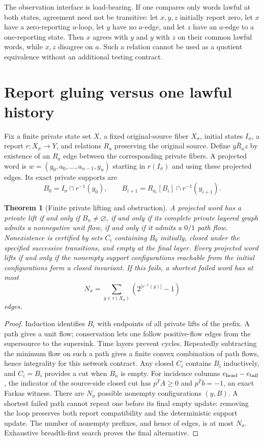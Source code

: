 \documentclass[11pt]{article}
\newtheorem{theorem}{Theorem}
\begin{document}
The observation interface is load-bearing. If one compares only words lawful
at both states, agreement need not be transitive: let $x,y,z$ initially report
zero, let $x$ have a zero-reporting $a$-loop, let $y$ have no $a$-edge, and let
$z$ have an $a$-edge to a one-reporting state. Then $x$ agrees with $y$ and $y$
with $z$ on their common lawful words, while $x,z$ disagree on $a$. Such a
relation cannot be used as a quotient equivalence without an additional
testing contract.

\section{Report gluing versus one lawful history}
Fix a finite private state set $X$, a fixed original-source fiber $X_\sigma$,
initial states $I_\sigma$, a report $r:X_\sigma\to Y$, and relations $R_a$
preserving the original source. Define $y\bar R_a z$ by existence of an
$R_a$ edge between the corresponding private fibers. A projected word is
$w=(y_0,a_0,\ldots,a_{n-1},y_n)$ starting in $r(I_\sigma)$ and using these
projected edges. Its exact private supports are
\[
B_0=I_\sigma\cap r^{-1}(y_0),\qquad
B_{i+1}=R_{a_i}[B_i]\cap r^{-1}(y_{i+1}).
\]
\begin{theorem}[Finite private lifting and obstruction]
A projected word has a private lift if and only if $B_n\ne\varnothing$,
if and only if its complete private layered graph admits a nonnegative unit
flow, if and only if it admits a $0/1$ path flow. Nonexistence is certified by
sets $C_i$ containing $B_0$ initially, closed under the specified successive
transitions, and empty at the final layer.
Every projected word lifts if and only if the nonempty support configurations
reachable from the initial configurations form a closed invariant. If this
fails, a shortest failed word has at most
\[
N_\sigma=\sum_{y\in r(X_\sigma)}(2^{|r^{-1}(y)|}-1)
\]
edges.
\end{theorem}
\begin{proof}
Induction identifies $B_i$ with endpoints of all private lifts of the prefix.
A path gives a unit flow; conservation lets one follow positive-flow edges
from the supersource to the supersink. Time layers prevent cycles. Repeatedly
subtracting the minimum flow on such a path gives a finite convex combination
of path flows, hence integrality for this network contract. Any closed $C_i$
contains $B_i$ inductively, and $C_i=B_i$ provides a cut when $B_n$ is empty.
For incidence columns $e_{\rm head}-e_{\rm tail}$, the indicator of the
source-side closed cut has $p^TA\ge0$ and $p^Tb=-1$, an exact Farkas witness.
There are $N_\sigma$ possible nonempty configurations $(y,B)$. A shortest
failed path cannot repeat one before its final empty update: removing the
loop preserves both report compatibility and the deterministic support
update. The number of nonempty prefixes, and hence of edges, is at most
$N_\sigma$. Exhaustive breadth-first search proves the final alternative.
\end{proof}
\end{document}
